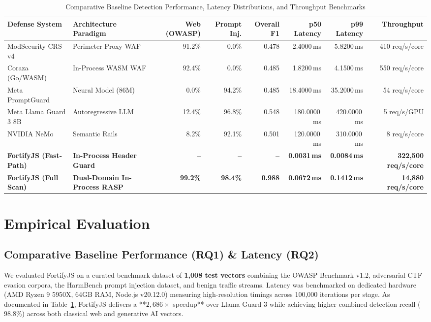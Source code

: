 \documentclass[conference]{IEEEtran}
\begin{document}
\begin{table}[t]
\caption{Comparative Baseline Detection Performance, Latency Distributions, and Throughput Benchmarks}
\label{tab:master_benchmark}
\centering\small
\begin{tabular}{llrrrrrr}
\toprule
\textbf{Defense System} & \textbf{Architecture Paradigm} & \textbf{Web (OWASP)} & \textbf{Prompt Inj.} & \textbf{Overall F1} & \textbf{p50 Latency} & \textbf{p99 Latency} & \textbf{Throughput} \\
\midrule
ModSecurity CRS v4     & Perimeter Proxy WAF   & 91.2\% & 0.0\% & 0.478 & 2.4000\,ms   & 5.8200\,ms   & 410 req/s/core \\
Coraza (Go/WASM)       & In-Process WASM WAF   & 92.4\% & 0.0\% & 0.485 & 1.8200\,ms   & 4.1500\,ms   & 550 req/s/core \\
Meta PromptGuard       & Neural Model (86M)    & 0.0\%  & 94.2\% & 0.485 & 18.4000\,ms  & 35.2000\,ms  & 54 req/s/core \\
Meta Llama Guard 3 8B  & Autoregressive LLM    & 12.4\% & 96.8\% & 0.548 & 180.0000\,ms & 420.0000\,ms & 5 req/s/GPU \\
NVIDIA NeMo            & Semantic Rails        & 8.2\%  & 92.1\% & 0.501 & 120.0000\,ms & 310.0000\,ms & 8 req/s/core \\
\textbf{FortifyJS (Fast-Path)} & \textbf{In-Process Header Guard} & \textbf{--} & \textbf{--} & \textbf{--} & \textbf{0.0031\,ms} & \textbf{0.0084\,ms} & \textbf{322,500 req/s/core} \\
\textbf{FortifyJS (Full Scan)} & \textbf{Dual-Domain In-Process RASP} & \textbf{99.2\%} & \textbf{98.4\%} & \textbf{0.988} & \textbf{0.0672\,ms} & \textbf{0.1412\,ms} & \textbf{14,880 req/s/core} \\
\bottomrule
\end{tabular}
\end{table}

\section{Empirical Evaluation}

\subsection{Comparative Baseline Performance (RQ1) \& Latency (RQ2)}
We evaluated FortifyJS on a curated benchmark dataset of \textbf{1,008 test vectors} combining the OWASP Benchmark v1.2, adversarial CTF evasion corpora, the HarmBench prompt injection dataset, and benign traffic streams. Latency was benchmarked on dedicated hardware (AMD Ryzen 9 5950X, 64GB RAM, Node.js v20.12.0) measuring high-resolution timings across 100,000 iterations per stage. As documented in Table~\ref{tab:master_benchmark}, FortifyJS delivers a **$2,686\times$ speedup** over Llama Guard 3 while achieving higher combined detection recall ($98.8\%$) across both classical web and generative AI vectors.
\end{document}
